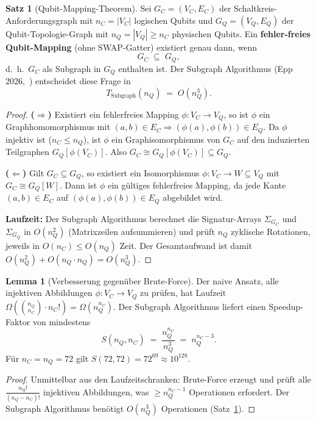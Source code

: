 ﻿\documentclass[a4paper,12pt]{article}
\theoremstyle{definition}
\newtheorem{satz}{Satz}
\newtheorem{lemma}{Lemma}
\begin{document}
\begin{satz}[Qubit-Mapping-Theorem]
\label{satz:mapping}
Sei $G_C = (V_C, E_C)$ der Schaltkreis-Anforderungsgraph mit $n_C = |V_C|$ logischen
Qubits und $G_Q = (V_Q, E_Q)$ der Qubit-Topologie-Graph mit $n_Q = |V_Q| \geq n_C$
physischen Qubits. Ein \textbf{fehler-freies Qubit-Mapping} (ohne SWAP-Gatter)
existiert genau dann, wenn
\[
  G_C \;\subseteq\; G_Q,
\]
d.~h.\ $G_C$ als Subgraph in $G_Q$ enthalten ist. Der Subgraph Algorithmus
(Epp 2026,~\cite{epp2026subgraph}) entscheidet diese Frage in
\[
  T_\mathrm{Subgraph}(n_Q) \;=\; O(n_Q^3).
\]
\end{satz}

\begin{proof}
\textbf{($\Rightarrow$)} Existiert ein fehlerfreies Mapping $\phi: V_C \to V_Q$, so
ist $\phi$ ein Graphhomomorphismus mit $(a,b) \in E_C \Rightarrow
(\phi(a),\phi(b)) \in E_Q$. Da $\phi$ injektiv ist ($n_C \leq n_Q$), ist $\phi$
ein Graphisomorphismus von $G_C$ auf den induzierten Teilgraphen
$G_Q[\phi(V_C)]$. Also $G_C \cong G_Q[\phi(V_C)] \subseteq G_Q$.

\textbf{($\Leftarrow$)} Gilt $G_C \subseteq G_Q$, so existiert ein Isomorphismus
$\phi: V_C \to W \subseteq V_Q$ mit $G_C \cong G_Q[W]$. Dann ist $\phi$ ein
gültiges fehlerfreies Mapping, da jede Kante $(a,b) \in E_C$ auf $(\phi(a),\phi(b))
\in E_Q$ abgebildet wird.

\textbf{Laufzeit:} Der Subgraph Algorithmus berechnet die Signatur-Arrays
$\Sigma_{G_C}$ und $\Sigma_{G_Q}$ in $O(n_Q^2)$ (Matrixzeilen aufsummieren) und
prüft $n_Q$ zyklische Rotationen, jeweils in $O(n_C) \leq O(n_Q)$ Zeit. Der
Gesamtaufwand ist damit $O(n_Q^2) + O(n_Q \cdot n_Q) = O(n_Q^3)$.
\end{proof}

\begin{lemma}[Verbesserung gegenüber Brute-Force]
\label{lemma:speedup}
Der naive Ansatz, alle injektiven Abbildungen $\phi: V_C \to V_Q$ zu prüfen, hat
Laufzeit $\Omega\!\left(\binom{n_Q}{n_C} \cdot n_C!\right) = \Omega(n_Q^{n_C})$.
Der Subgraph Algorithmus liefert einen Speedup-Faktor von mindestens
\[
  S(n_Q, n_C) \;=\; \frac{n_Q^{n_C}}{n_Q^3} \;=\; n_Q^{n_C - 3}.
\]
Für $n_C = n_Q = 72$ gilt $S(72, 72) = 72^{69} \approx 10^{128}$.
\end{lemma}

\begin{proof}
Unmittelbar aus den Laufzeitschranken: Brute-Force erzeugt und prüft alle
$\frac{n_Q!}{(n_Q - n_C)!}$ injektiven Abbildungen, was $\geq n_Q^{n_C - 1}$
Operationen erfordert. Der Subgraph Algorithmus benötigt $O(n_Q^3)$
Operationen (Satz~\ref{satz:mapping}).
\end{proof}
\end{document}
